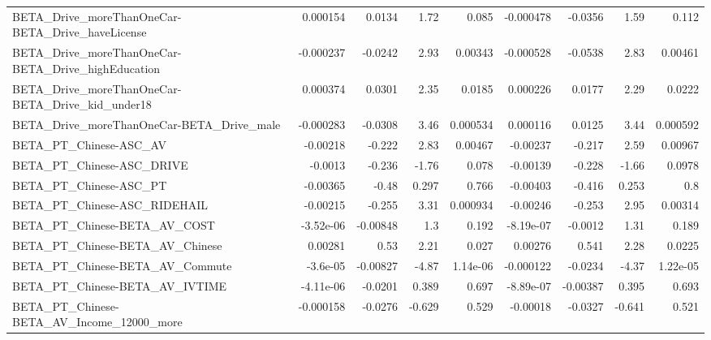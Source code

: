 \begin{tabular}{lrrrrrrrr}
BETA\_Drive\_moreThanOneCar-BETA\_Drive\_haveLicense   &    0.000154 &       0.0134 &      1.72 &    0.085 &  -0.000478 &     -0.0356 &         1.59 &         0.112 \\
BETA\_Drive\_moreThanOneCar-BETA\_Drive\_highEducation &   -0.000237 &      -0.0242 &      2.93 &  0.00343 &  -0.000528 &     -0.0538 &         2.83 &       0.00461 \\
BETA\_Drive\_moreThanOneCar-BETA\_Drive\_kid\_under18   &    0.000374 &       0.0301 &      2.35 &   0.0185 &   0.000226 &      0.0177 &         2.29 &        0.0222 \\
BETA\_Drive\_moreThanOneCar-BETA\_Drive\_male          &   -0.000283 &      -0.0308 &      3.46 & 0.000534 &   0.000116 &      0.0125 &         3.44 &      0.000592 \\
BETA\_PT\_Chinese-ASC\_AV                             &    -0.00218 &       -0.222 &      2.83 &  0.00467 &   -0.00237 &      -0.217 &         2.59 &       0.00967 \\
BETA\_PT\_Chinese-ASC\_DRIVE                          &     -0.0013 &       -0.236 &     -1.76 &    0.078 &   -0.00139 &      -0.228 &        -1.66 &        0.0978 \\
BETA\_PT\_Chinese-ASC\_PT                             &    -0.00365 &        -0.48 &     0.297 &    0.766 &   -0.00403 &      -0.416 &        0.253 &           0.8 \\
BETA\_PT\_Chinese-ASC\_RIDEHAIL                       &    -0.00215 &       -0.255 &      3.31 & 0.000934 &   -0.00246 &      -0.253 &         2.95 &       0.00314 \\
BETA\_PT\_Chinese-BETA\_AV\_COST                       &   -3.52e-06 &     -0.00848 &       1.3 &    0.192 &  -8.19e-07 &     -0.0012 &         1.31 &         0.189 \\
BETA\_PT\_Chinese-BETA\_AV\_Chinese                    &     0.00281 &         0.53 &      2.21 &    0.027 &    0.00276 &       0.541 &         2.28 &        0.0225 \\
BETA\_PT\_Chinese-BETA\_AV\_Commute                    &    -3.6e-05 &     -0.00827 &     -4.87 & 1.14e-06 &  -0.000122 &     -0.0234 &        -4.37 &      1.22e-05 \\
BETA\_PT\_Chinese-BETA\_AV\_IVTIME                     &   -4.11e-06 &      -0.0201 &     0.389 &    0.697 &  -8.89e-07 &    -0.00387 &        0.395 &         0.693 \\
BETA\_PT\_Chinese-BETA\_AV\_Income\_12000\_more          &   -0.000158 &      -0.0276 &    -0.629 &    0.529 &   -0.00018 &     -0.0327 &       -0.641 &         0.521 \\

\end{tabular}
